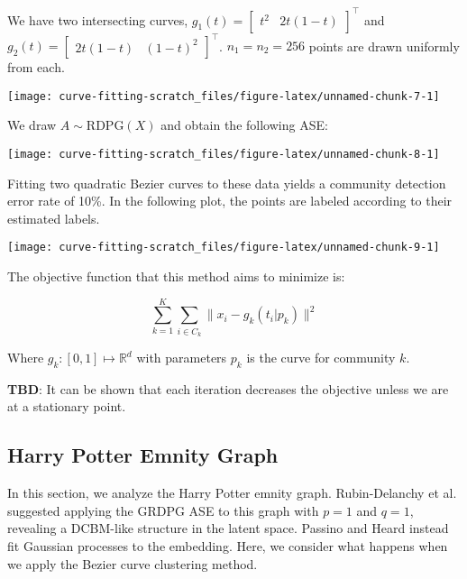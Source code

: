 \documentclass[
  11pt,
]{article}
\begin{document}
\begin{example}



We have two intersecting curves, $g_1(t) = \begin{bmatrix} t^2 & 2 t (1 - t) \end{bmatrix}^\top$ and $g_2(t) = \begin{bmatrix} 2 t (1 - t) & (1 - t) ^ 2 \end{bmatrix}^\top$. $n_1 = n_2 = 256$ points are drawn uniformly from each.


\begin{center}\texttt{[image: curve-fitting-scratch\_files/figure-latex/unnamed-chunk-7-1]} \end{center}

We draw $A \sim \mathrm{RDPG}(X)$ and obtain the following ASE:


\begin{center}\texttt{[image: curve-fitting-scratch\_files/figure-latex/unnamed-chunk-8-1]} \end{center}

Fitting two quadratic Bezier curves to these data yields a community detection error rate of 10\%. 
In the following plot, the points are labeled according to their estimated labels.


\begin{center}\texttt{[image: curve-fitting-scratch\_files/figure-latex/unnamed-chunk-9-1]} \end{center}

\end{example}

The objective function that this method aims to minimize is:

\[\sum_{k=1}^K \sum_{i \in C_k} \|x_i - g_k(t_i | p_k)\|^2\]

Where \(g_k : [0, 1] \mapsto \mathbb{R}^d\) with parameters \(p_k\) is
the curve for community \(k\).

\textbf{TBD}: It can be shown that each iteration decreases the
objective unless we are at a stationary point.

\hypertarget{harry-potter-emnity-graph}{%
\subsection{Harry Potter Emnity Graph}\label{harry-potter-emnity-graph}}

\begin{example}
In this section, we analyze the Harry Potter emnity graph. 
Rubin-Delanchy et al. suggested applying the GRDPG ASE to this graph with $p = 1$ and $q = 1$, revealing a DCBM-like structure in the latent space. 
Passino and Heard instead fit Gaussian processes to the embedding. 
Here, we consider what happens when we apply the Bezier curve clustering method. 
\end{example}
\end{document}
